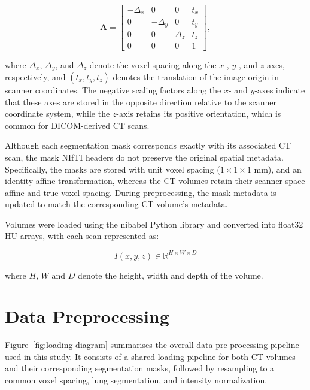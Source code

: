 \begin{equation}[Scanner-Space Affine Matrix]
\mathbf{A} =
\begin{bmatrix}
-\Delta_x & 0 & 0 & t_x \\
0 & -\Delta_y & 0 & t_y \\
0 & 0 & \Delta_z & t_z \\
0 & 0 & 0 & 1
\end{bmatrix},
\end{equation}

\noindent where $\Delta_x$, $\Delta_y$, and $\Delta_z$ denote the voxel spacing along the $x$-, $y$-, and $z$-axes, respectively,
and $(t_x,t_y,t_z)$ denotes the translation of the image origin in scanner coordinates. The negative scaling factors along the
$x$- and $y$-axes indicate that these axes are stored in the opposite direction relative to the scanner coordinate system, while
the $z$-axis retains its positive orientation, which is common for DICOM-derived CT scans.

Although each segmentation mask corresponds exactly with its associated CT scan, the mask NIfTI headers do not preserve the
original spatial metadata. Specifically, the masks are stored with unit voxel spacing ($1 \times 1 \times 1$ mm), and an identity
affine transformation, whereas the CT volumes retain their scanner-space affine and true voxel spacing. During preprocessing,
the mask metadata is updated to match the corresponding CT volume's metadata.

Volumes were loaded using the nibabel Python library and converted into float32 HU arrays, with each scan represented as:

\begin{equation}[CT Volume Representation]
I(x,y,z) \in \mathbb{R}^{H \times W \times D}
\end{equation}

\noindent where $H$, $W$ and $D$ denote the height, width and depth of the volume.

\section{Data Preprocessing}

Figure~\ref{fig:loading-diagram} summarises the overall data pre-processing pipeline used in this study.
It consists of a shared loading pipeline for both CT volumes and their corresponding segmentation masks, followed by
resampling to a common voxel spacing, lung segmentation, and intensity normalization.

